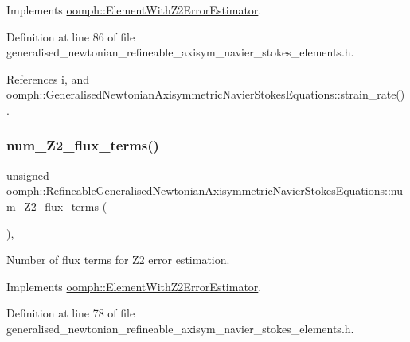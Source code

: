 Implements \hyperlink{classoomph_1_1ElementWithZ2ErrorEstimator_a5688ff5f546d81771cabad82ca5a7556}{oomph\+::\+Element\+With\+Z2\+Error\+Estimator}.



Definition at line 86 of file generalised\+\_\+newtonian\+\_\+refineable\+\_\+axisym\+\_\+navier\+\_\+stokes\+\_\+elements.\+h.



References i, and oomph\+::\+Generalised\+Newtonian\+Axisymmetric\+Navier\+Stokes\+Equations\+::strain\+\_\+rate().

\mbox{\label{classoomph_1_1RefineableGeneralisedNewtonianAxisymmetricNavierStokesEquations_aa0085413944f5d84578ae28f57d7f4fc}} 
\subsubsection{\texorpdfstring{num\+\_\+\+Z2\+\_\+flux\+\_\+terms()}{num\_Z2\_flux\_terms()}}
{\footnotesize\ttfamily unsigned oomph\+::\+Refineable\+Generalised\+Newtonian\+Axisymmetric\+Navier\+Stokes\+Equations\+::num\+\_\+\+Z2\+\_\+flux\+\_\+terms (\begin{DoxyParamCaption}{ }\end{DoxyParamCaption})\hspace{0.3cm}{\ttfamily [inline]}, {\ttfamily [virtual]}}



Number of \textquotesingle{}flux\textquotesingle{} terms for Z2 error estimation. 



Implements \hyperlink{classoomph_1_1ElementWithZ2ErrorEstimator_ae82c5728902e13da31be19c390fc28e3}{oomph\+::\+Element\+With\+Z2\+Error\+Estimator}.



Definition at line 78 of file generalised\+\_\+newtonian\+\_\+refineable\+\_\+axisym\+\_\+navier\+\_\+stokes\+\_\+elements.\+h.

